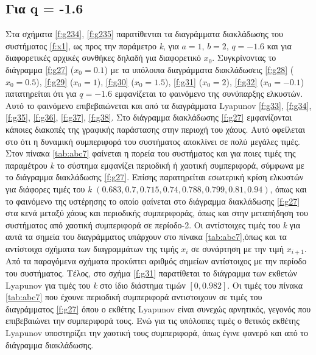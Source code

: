 \clearpage
\subsection{Για q = -1.6}
Στα σχήματα \ref{f:g234}, \ref{f:g235}  παρατίθενται τα διαγράμματα διακλάδωσης του συστήματος \ref{f:x1}, ως προς την παράμετρο \emph{k}, για $a = 1$, $b = 2$, $q =- 1.6$ και για διαφορετικές αρχικές συνθήκες δηλαδή για διαφορετικό \(x_0\). Συγκρίνοντας το διάγραμμα \ref{f:g27} (\(x_0=0.1\)) με τα υπόλοιπα διαγράμματα διακλάδωσεις \ref{f:g28}  (\(x_0=0.5\)), \ref{f:g29}  (\(x_0=1\)), \ref{f:g30}  (\(x_0=1.5\)), \ref{f:g31}  (\(x_0=2\)), \ref{f:g32}  (\(x_0=-0.1\)) πατατηρείται ότι για $q= -1.6$ εμφανίζεται το φαινόμενο της συνύπαρξης ελκυστών. Αυτό το φαινόμενο επιβεβαιώνεται και από τα διαγράμματα Lyapunov \ref{f:g33}, \ref{f:g34}, \ref{f:g35}, \ref{f:g36}, \ref{f:g37}, \ref{f:g38}.
Στο διάγραμμα διακλάδωσης \ref{f:g27} εμφανίζονται κάποιες διακοπές της γραφικής παράστασης στην περιοχή του χάους. Αυτό οφείλεται στο ότι η δυναμική συμπεριφορά του συστήματος αποκλίνει σε πολύ μεγάλες τιμές.
Στον πίνακα \ref{tab:abc7} φαίνεται η πορεία του συστήματος και για ποιες τιμές της παραμέτρου  \emph{k} το σύστημα εμφανίζει περιοδική ή χαοτική συμπεριφορά, σύμφωνα με το διάγραμμα διακλάδωσης \ref{f:g27}.
Επίσης παρατηρείται εσωτερική κρίση ελκυστών για διάφορες τιμές του \emph{k} $(0.683, 0.7, 0.715, 0.74, 0.788, 0.799, 0.81, 0.94)$, όπως και το φαινόμενο της υστέρησης το οποίο φαίνεται στο διάγραμμα διακλάδωσης \ref{f:g27} στα κενά μεταξύ χάους και περιοδικής συμπεριφοράς, όπως και στην μεταπήδηση του συστήματος από χαοτική συμπεριφορά σε περίοδο-2. Οι αντίστοιχες τιμές του \emph{k} για αυτά τα σημεία του διαγράμματος υπάρχουν στο πίνακα \ref{tab:abc7},όπως και τα αντίστοιχα σχήματα των διαγραμμάτων της τιμής \(x_i\) σε συνάρτηση με την τιμή \(x_{i+1}\). Από τα παραγόμενα σχήματα προκύπτει αριθμός σημείων αντίστοιχος με την περίοδο του συστήματος.
Τέλος, στο σχήμα \ref{f:g31} παρατίθεται το διάγραμμα των εκθετών Lyapunov για τιμές του \emph{k} στο ίδιο διάστημα τιμών $[0, 0.982]$. Οι τιμές του πίνακα \ref{tab:abc7} που έχουνε περιοδική συμπεριφορά αντιστοιχουν σε τιμές του διαγράμματος \ref{f:g27} όπου ο εκθέτης Lyapunov είναι συνεχώς αρνητικός, γεγονός που επιβεβαιώνει την συμπεριφορά τους. Ενώ για τις υπόλοιπες τιμές ο θετικός εκθέτης Lyapunov υποστηρίζει την χαοτική τους συμπεριφορά, όπως έγινε φανερό και από το διάγραμμα διακλάδωσης.


